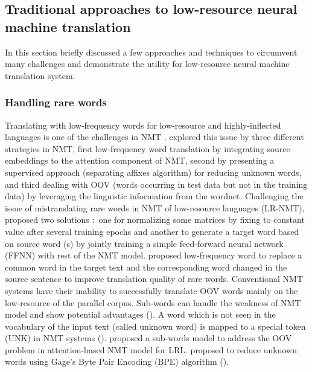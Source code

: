 \documentclass[manuscript,screen]{acmart}
\begin{document}
\subsection{Traditional approaches to low-resource neural machine translation}
In this section briefly discussed a few approaches and techniques to circumvent many challenges and demonstrate the utility for low-resource neural machine translation system.
\subsubsection{\bf{Handling rare words}}
Translating with low-frequency words for low-resource and highly-inflected languages is one of the challenges in NMT \citet{koehn2017six,ngo2019overcoming}. \citet{ngo2019overcoming} explored this issue by three different strategies in NMT, first low-frequency word translation by integrating source embeddings to the attention component of NMT, second by presenting a supervised approach (separating affixes algorithm) for reducing unknown words, and third dealing with OOV (words occurring in test data but not in the training data) by leveraging the linguistic information from the wordnet. Challenging the issue of mistranslating rare words in NMT of low-resource languages (LR-NMT), \citet{ngo2019overcoming} proposed two solutions $\colon$ one for normalizing some matrices by fixing to constant value after several training epochs and another to generate a target word based on source word (s) by jointly training a simple feed-forward neural network (FFNN) with rest of the NMT model. \citet{fadaee2017data} proposed low-frequency word to replace a common word in the target text and the corresponding word changed in the source sentence to improve translation quality of rare words. Conventional NMT systems have their inability to successfully translate OOV words mainly on the low-resource of the parallel corpus. Sub-words can handle the weakness of NMT model and show potential advantages (\citet{sennrich2016neural,wu2016adapting}). A word which is not seen in the vocabulary of the input text (called unknown word) is mapped to a special token (UNK) in NMT systems (\citet{jean2015using,luong-etal-2015-addressing}). \citet{wu2016adapting} proposed a sub-words model to address the OOV problem in attention-based NMT model for LRL. \citet{sennrich2016neural} proposed to reduce unknown words using Gage’s Byte Pair Encoding (BPE) algorithm (\citet{gage1994new}).
\end{document}
